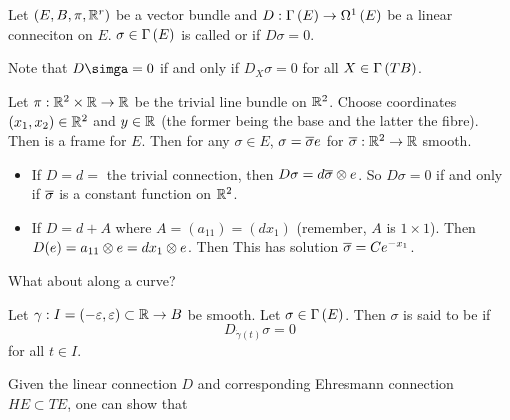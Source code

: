 \documentclass[main.tex]{subfiles}
\begin{document}
    \begin{defn}
      Let $(E, B, \pi, \mathbb{R}^r)$ be a vector bundle and $D: \Gamma\left( E \right) \to \Omega^{1}\left( E \right)$ be a linear conneciton on $E$. $\sigma \in \Gamma\left( E \right)$ is called  or  if $D \sigma = 0$.
    \end{defn}

    Note that $D \simga= 0$ if and only if $D_X \sigma = 0$ for all $X \in \Gamma\left( TB \right)$.

    \begin{exmp}
      Let $\pi: \mathbb{R}^2 \times \mathbb{R} \to \mathbb{R}$ be the trivial line bundle on $\mathbb{R}^2$. Choose coordinates $(x_1, x_2) \in \mathbb{R}^2$ and $y \in \mathbb{R}$ (the former being the base and the latter the fibre). Then
       is a frame for $E$. Then for any $\sigma \in E$, $\sigma = \overline{\sigma}  e$ for $\overline{\sigma}: \mathbb{R}^2 \to \mathbb{R}$ smooth.
      \begin{itemize}
        \item If $D = d =$ the trivial connection, then $D \sigma = d\overline{\sigma} \otimes e$. So $D \sigma = 0$ if and only if $\overline{\sigma}$ is a constant function  on $\mathbb{R}^2$.
        \item If $D = d + A$ where $A = (a_{11}) =  (dx_1)$ (remember, $A$ is $1 \times 1$). Then $D(e) = a_{11} \otimes e = dx_1 \otimes e$. Then
         This has solution $\overline{\sigma} = Ce^{-x_1}$.
      \end{itemize}
    \end{exmp}

    What about along a curve?

    \begin{defn}
       Let $\gamma: I = (-\varepsilon, \varepsilon) \subset \mathbb{R} \to B$ be smooth. Let $\sigma \in \Gamma\left( E \right)$. Then $\sigma$ is said to be  if
      \[
      D_{\dot{\gamma}(t)} \sigma = 0
      \] for all $t \in I$.
    \end{defn}

    Given the linear connection $D$ and corresponding Ehresmann connection $HE \subset TE$, one can show that
\end{document}
